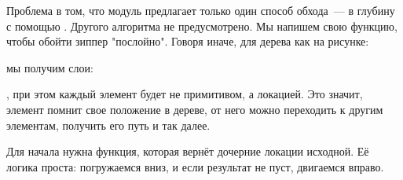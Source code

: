 

Проблема в том, что модуль  предлагает только один способ обхода~---
в глубину с помощью . Другого алгоритма не предусмотрено. Мы напишем
свою функцию, чтобы обойти зиппер "послойно". Говоря иначе, для дерева как на
рисунке:



\noindent
мы получим слои:

\begin{english}
  \begin{clojure}
[1]
[2 3]
[4 5 6 7]
  \end{clojure}
\end{english}

\noindent
, при этом каждый элемент будет не примитивом, а локацией. Это значит, элемент
помнит свое положение в дереве, от него можно переходить к другим элементам,
получить его путь и так далее.

Для начала нужна функция, которая вернёт дочерние локации исходной. Её логика
проста: погружаемся вниз, и если результат не пуст, двигаемся вправо.

